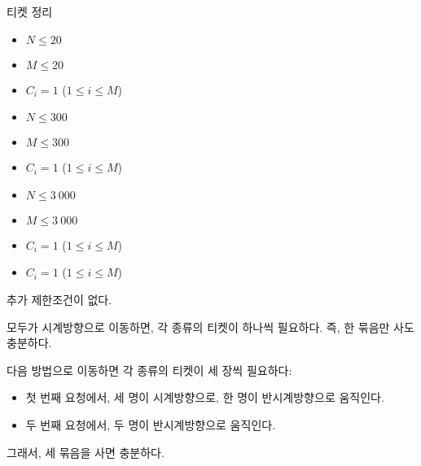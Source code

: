 \begin{problem}{티켓 정리}
	
	\begin{itemize}
		\item $N \le 20$
		\item $M \le 20$
		\item $C_i = 1$ ($1 \le i \le M$)
	\end{itemize}


	\begin{itemize}
		\item $N \le 300$
		\item $M \le 300$
		\item $C_i = 1$ ($1 \le i \le M$)
	\end{itemize}

	\begin{itemize}
		\item $N \le 3\ 000$
		\item $M \le 3\ 000$
		\item $C_i = 1$ ($1 \le i \le M$)
	\end{itemize}

	\begin{itemize}
		\item $C_i = 1$ ($1 \le i \le M$)
	\end{itemize}
	
	
	
	추가 제한조건이 없다.
	
	\Examples
		
	\begin{example}
	\end{example}
	
	모두가 시계방향으로 이동하면, 각 종류의 티켓이 하나씩 필요하다. 즉, 한 묶음만 사도 충분하다.	
	
	\begin{example}
	\exmp{
		3 2
		1 2 4
		1 2 2
	}{%
		3
	}%
	\end{example}

	다음 방법으로 이동하면 각 종류의 티켓이 세 장씩 필요하다:
	
	\begin{itemize}
		\item 첫 번째 요청에서, 세 명이 시계방향으로, 한 명이 반시계방향으로 움직인다.
		\item 두 번째 요청에서, 두 명이 반시계방향으로 움직인다.
	\end{itemize}

	그래서, 세 묶음을 사면 충분하다.
	

\end{problem}
